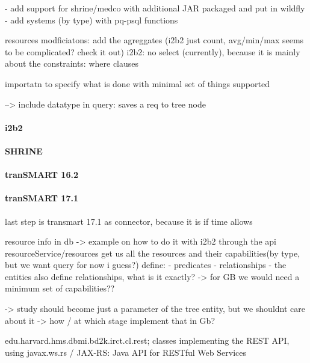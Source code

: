- add support for shrine/medco with additional JAR packaged and put in wildfly
- add systems (by type) with pq-psql functions

resources modficiatons: add the agreggates (i2b2 just count, avg/min/max seems to be complicated? check it out)
i2b2: no select (currently), because it is mainly about the constraints: where clauses

importatn to specify what is done with minimal set of things supported

--> include datatype in query: saves a req to tree node
\paragraph{i2b2}

\paragraph{SHRINE}

\paragraph{tranSMART 16.2}

\paragraph{tranSMART 17.1}
last step is transmart 17.1 as connector, because it is if time allows


resource info in db -> example on how to do it with i2b2
through the api resourceService/resources get us all the resources and their capabilities(by type, but we want query for now i guess?)
define:
- predicates
- relationships
- the entities also define relationships, what is it exactly?
-> for GB we would need a minimum set of capabilities??

-> study should become just a parameter of the tree entity, but we shouldnt care about it
-> how / at which stage implement that in Gb?

edu.harvard.hms.dbmi.bd2k.irct.cl.rest;
classes implementing the REST API, using javax.ws.rs / JAX-RS: Java API for RESTful Web Services

